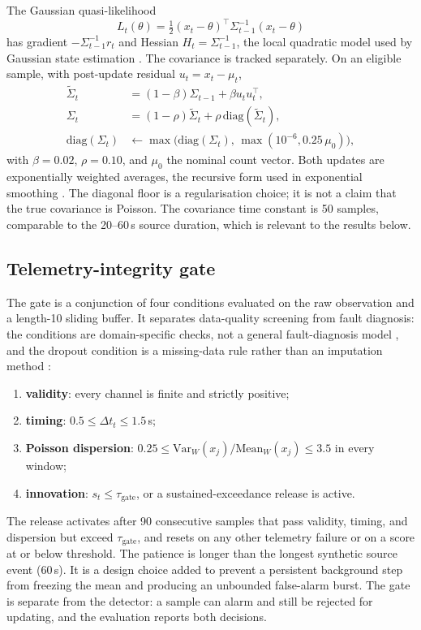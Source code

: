 \documentclass[11pt]{article}
\begin{document}
The Gaussian quasi-likelihood
\begin{equation}
  L_t(\theta) = \tfrac12 (x_t-\theta)^\top \Sigma_{t-1}^{-1}(x_t-\theta)
\end{equation}
has gradient $-\Sigma_{t-1}^{-1}r_t$ and Hessian $H_t=\Sigma_{t-1}^{-1}$, the local quadratic model used by Gaussian state estimation \citep{ljung1999system}. The covariance is tracked separately. On an eligible sample, with post-update residual $u_t=x_t-\mu_t$,
\begin{align}
  \tilde\Sigma_t &= (1-\beta)\Sigma_{t-1} + \beta u_t u_t^\top,\\
  \Sigma_t &= (1-\rho)\tilde\Sigma_t + \rho\,\mathrm{diag}(\tilde\Sigma_t),\\
  \mathrm{diag}(\Sigma_t) &\leftarrow \max\!\bigl(\mathrm{diag}(\Sigma_t),\, \max(10^{-6}, 0.25\,\mu_0)\bigr),
\end{align}
with $\beta=0.02$, $\rho=0.10$, and $\mu_0$ the nominal count vector. Both updates are exponentially weighted averages, the recursive form used in exponential smoothing \citep{gardner1985exponential}. The diagonal floor is a regularisation choice; it is not a claim that the true covariance is Poisson. The covariance time constant is 50 samples, comparable to the 20--60\,s source duration, which is relevant to the results below.

\subsection{Telemetry-integrity gate}

The gate is a conjunction of four conditions evaluated on the raw observation and a length-10 sliding buffer. It separates data-quality screening from fault diagnosis: the conditions are domain-specific checks, not a general fault-diagnosis model \citep{isermann2005model}, and the dropout condition is a missing-data rule rather than an imputation method \citep{little2019missing}:
\begin{enumerate}
  \item \textbf{validity}: every channel is finite and strictly positive;
  \item \textbf{timing}: $0.5 \le \Delta t_t \le 1.5$\,s;
  \item \textbf{Poisson dispersion}: $0.25 \le \mathrm{Var}_W(x_j)/\mathrm{Mean}_W(x_j) \le 3.5$ in every window;
  \item \textbf{innovation}: $s_t \le \tau_{\mathrm{gate}}$, or a sustained-exceedance release is active.
\end{enumerate}
The release activates after 90 consecutive samples that pass validity, timing, and dispersion but exceed $\tau_{\mathrm{gate}}$, and resets on any other telemetry failure or on a score at or below threshold. The patience is longer than the longest synthetic source event (60\,s). It is a design choice added to prevent a persistent background step from freezing the mean and producing an unbounded false-alarm burst. The gate is separate from the detector: a sample can alarm and still be rejected for updating, and the evaluation reports both decisions.
\end{document}
